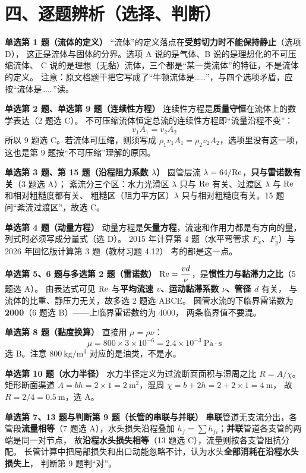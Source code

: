 \section*{四、逐题辨析（选择、判断）}

\noindent\textbf{单选第 1 题（流体的定义）}\quad
“流体”的定义落点在\textbf{受剪切力时不能保持静止}（选项 D），
这正是流体与固体的分界。选项 A 说的是气体、B 说的是理想化的不可压缩流体、
C 说的是理想（无黏）流体，三个都是“某一类流体”的特征，不是流体的定义。
注意：原文档题干把它写成了“牛顿流体是……”，与四个选项矛盾，应按“流体是……”读。

\noindent\textbf{单选第 2 题、单选第 9 题（连续性方程）}\quad
连续性方程是\textbf{质量守恒}在流体上的数学表达（2 题选 C）。
不可压缩流体恒定总流的连续性方程即“流量沿程不变”：
\[ v_1A_1=v_2A_2 \]
所以 9 题选 C。若流体可压缩，则须写成 $\rho_1v_1A_1=\rho_2v_2A_2$，选项里没有这一项，
这也是第 9 题按“不可压缩”理解的原因。

\noindent\textbf{单选第 3 题、第 15 题（沿程阻力系数 $\lambda$）}\quad
圆管层流 $\lambda=64/\mathrm{Re}$，\textbf{只与雷诺数有关}（3 题选 A）；
紊流分三个区：水力光滑区 $\lambda$ 只与 $\mathrm{Re}$ 有关、过渡区 $\lambda$ 与 $\mathrm{Re}$ 和相对粗糙度都有关、
粗糙区（阻力平方区）$\lambda$ 只与相对粗糙度有关。15 题问“紊流过渡区”，故选 C。

\noindent\textbf{单选第 4 题（动量方程）}\quad
动量方程是\textbf{矢量方程}，流速和作用力都是有方向的量，列式时必须写成分量式（选 D）。
2015 年计算第 4 题（水平弯管求 $F_x$、$F_y$）与 2026 年回忆版计算第 3 题（教材习题 4.12）
考的都是这一点。

\noindent\textbf{单选第 5、6 题与多选第 2 题（雷诺数）}\quad
$\mathrm{Re}=\dfrac{vd}{\nu}$，是\textbf{惯性力与黏滞力之比}（5 题选 A）。
由表达式可见 $\mathrm{Re}$ 与\textbf{平均流速 $v$、运动黏滞系数 $\nu$、管径 $d$} 有关，
与流体的比重、静压力无关，故多选 2 题选 ABCE。
圆管水流的下临界雷诺数为 \textbf{2000}（6 题选 B）——上临界雷诺数约为 4000，
两条临界值不要混。

\noindent\textbf{单选第 8 题（黏度换算）}\quad
直接用 $\mu=\rho\nu$：
\[ \mu=800\times3\times10^{-6}=2.4\times10^{-3}\ \mathrm{Pa\cdot s} \]
选 B。注意 $800\ \mathrm{kg/m^3}$ 对应的是油类，不是水。

\noindent\textbf{单选第 10 题（水力半径）}\quad
水力半径定义为过流断面面积与湿周之比 $R=A/\chi$。矩形断面渠道
$A=bh=2\times1=2\ \mathrm{m^2}$，湿周 $\chi=b+2h=2+2\times1=4\ \mathrm{m}$，
故 $R=2/4=0.5\ \mathrm{m}$，选 A。

\noindent\textbf{单选第 7、13 题与判断第 9 题（长管的串联与并联）}\quad
\textbf{串联}管道无支流分出，各管段\textbf{流量相等}（7 题选 A），水头损失沿程叠加
$h_f=\sum h_{fi}$；\textbf{并联}管道各支管的两端是同一对节点，
故\textbf{沿程水头损失相等}（13 题选 C），流量则按各支管阻抗分配。
长管计算中把局部损失和出口动能忽略不计，认为水头\textbf{全部消耗在沿程水头损失上}，
判断第 9 题判“对”。

